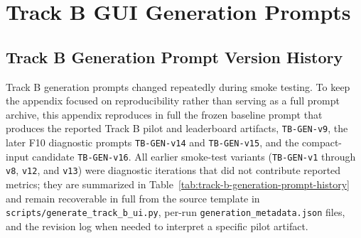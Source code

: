 \section{Track B GUI Generation Prompts}
\label{app:track-b-generation-prompts}

\subsection{Track B Generation Prompt Version History}
\label{app:track-b-generation-version-history}

Track B generation prompts changed repeatedly during smoke testing. To keep
the appendix focused on reproducibility rather than serving as a full prompt
archive, this appendix reproduces in full the frozen baseline prompt that
produces the reported Track B pilot and leaderboard artifacts,
\texttt{TB-GEN-v9}, the later F10 diagnostic prompts
\texttt{TB-GEN-v14} and \texttt{TB-GEN-v15}, and the compact-input candidate
\texttt{TB-GEN-v16}. All earlier smoke-test variants
(\texttt{TB-GEN-v1} through \texttt{v8}, \texttt{v12}, and \texttt{v13}) were
diagnostic iterations that did not contribute reported metrics; they are
summarized in Table~\ref{tab:track-b-generation-prompt-history} and remain
recoverable in full from the source template in
\texttt{scripts/generate\_track\_b\_ui.py}, per-run
\texttt{generation\_metadata.json} files, and the revision log when needed to
interpret a specific pilot artifact.

